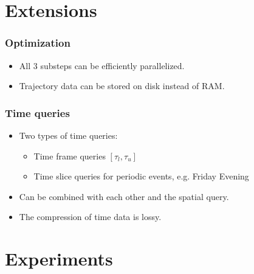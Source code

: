 \documentclass{beamer}
\newcommand{\getAssociatedTrajectories}{GetAssociatedTrajectories\xspace}
\begin{document}
%

\section{Extensions}

\begin{frame}
	\frametitle{Optimization}
	\begin{itemize}
		\item<1-> All 3 substeps can be efficiently parallelized.
		\item<2-> Trajectory data can be stored on disk instead of RAM.
	\end{itemize}
\end{frame}

\begin{frame}
	\frametitle{Time queries}
	\begin{itemize}

		\item	Two types of time queries: \pause
		      \begin{itemize}
			      \item Time frame queries $[\tau_l, \tau_u]$ \pause
			      \item Time slice queries for periodic events, e.g. Friday Evening \pause
		      \end{itemize}

		\item Can be combined with each other and the spatial query. \pause

		\item The compression of time data is lossy.
	\end{itemize}
\end{frame}

\section{Experiments}
\end{document}
